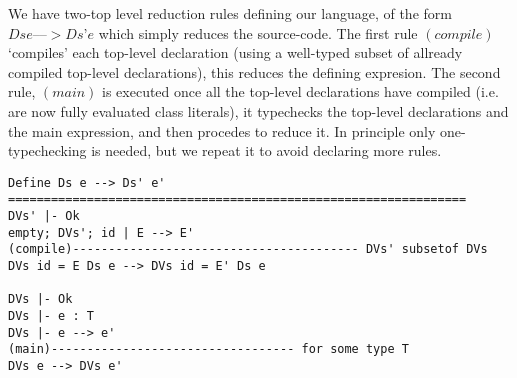 \begin{comment}
Define p(P) = LV
-----------------------------------


p.exists(Ps) iff forall P in Ps: p(P) is defined

Define L(Cs) = L
--------------------------------------
L(empty) = L
L(C.Cs) = L(Cs)
    L = interface? {_; _, C = L, _; _}

Define L[CD]=L'
---------------------------------------------
L[C = E'] = interface? {Tz; MVs C = E' Ms; K?}
  L = interface? {Tz; MVs C = _ Ms; K?}


Define operations on p
--------------------------------------
p.evilPush(L) = (C = L, p)
	for fresh C

p.push(id) = (id = L, p)
    p = (id' = {_;_, id = L, _ ;_}, _; Ds)

(id = L, p).pop() = p
(id = L, p).top() = L

Define equivy ops...
------------------------------
empty =p empty
P, Ps =p P', Ps' iff:
	p.minimize(P) = p.minimize(P')
	Ps =p Ps'

Pz subseteq_p Pz' iff:
	p.minimize(Pz) subseteq p.minimize(Pz')

p.minimize(empty) = empty
p.minimize(P, Pz) = p.minimize(P), p.minimize(Pz)

p.minimize(Thisn+1.idn.Cs) = p.minimize(Thisn.Cs):
  p = id0 = L0, ..., idn = Ln, _; Ds
  p(Thisn.Cs) = L
  // TODO: Check that Ln is an L instead?

otherwise p.minimize(P) = P

define dom(Mz) = Midz
===========================================
dom(empty) = empty
dom(C = E, Mz) = C, dom(Mz)
dom(T m(Txs), Mz) = m, dom(Mz)
\end{comment}

We have two-top level reduction rules defining our language, of the form $Ds e ––> Ds’ e$ which simply reduces the source-code.
The first rule $(compile)$ ‘compiles’ each top-level declaration (using a well-typed subset of allready compiled top-level declarations), this reduces the defining expresion.
The second rule, $(main)$ is executed once all the top-level declarations have compiled (i.e. are now fully evaluated class literals), it typechecks the top-level declarations and the main expression, and then procedes to reduce it.
In principle only one-typechecking is needed, but we repeat it to avoid declaring more rules.
\begin{verbatim}
Define Ds e --> Ds' e'
================================================================
DVs' |- Ok
empty; DVs'; id | E --> E'
(compile)---------------------------------------- DVs' subsetof DVs
DVs id = E Ds e --> DVs id = E' Ds e

DVs |- Ok
DVs |- e : T
DVs |- e --> e'
(main)---------------------------------- for some type T
DVs e --> DVs e'
\end{verbatim}



